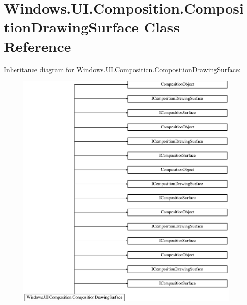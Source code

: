 \hypertarget{class_windows_1_1_u_i_1_1_composition_1_1_composition_drawing_surface}{}\section{Windows.\+U\+I.\+Composition.\+Composition\+Drawing\+Surface Class Reference}
\label{class_windows_1_1_u_i_1_1_composition_1_1_composition_drawing_surface}
Inheritance diagram for Windows.\+U\+I.\+Composition.\+Composition\+Drawing\+Surface\+:\begin{figure}[H]
\begin{center}
\leavevmode
\includegraphics[height=12.000000cm]{class_windows_1_1_u_i_1_1_composition_1_1_composition_drawing_surface}
\end{center}
\end{figure}
